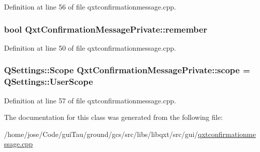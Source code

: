 Definition at line 56 of file qxtconfirmationmessage.\-cpp.

\hypertarget{class_qxt_confirmation_message_private_a9de9dfa7c96ceea1f0ada51a94f46edb}{
\subsubsection[{remember}]{\setlength{\rightskip}{0pt plus 5cm}bool Qxt\-Confirmation\-Message\-Private\-::remember}}\label{class_qxt_confirmation_message_private_a9de9dfa7c96ceea1f0ada51a94f46edb}


Definition at line 50 of file qxtconfirmationmessage.\-cpp.

\hypertarget{class_qxt_confirmation_message_private_a200e962e441de486fcf261417c60cedd}{
\subsubsection[{scope}]{\setlength{\rightskip}{0pt plus 5cm}Q\-Settings\-::\-Scope Qxt\-Confirmation\-Message\-Private\-::scope = Q\-Settings\-::\-User\-Scope\hspace{0.3cm}{\ttfamily [static]}}}\label{class_qxt_confirmation_message_private_a200e962e441de486fcf261417c60cedd}


Definition at line 57 of file qxtconfirmationmessage.\-cpp.



The documentation for this class was generated from the following file\-:\begin{DoxyCompactItemize}
\item 
/home/jose/\-Code/gui\-Tau/ground/gcs/src/libs/libqxt/src/gui/\hyperlink{qxtconfirmationmessage_8cpp}{qxtconfirmationmessage.\-cpp}\end{DoxyCompactItemize}
